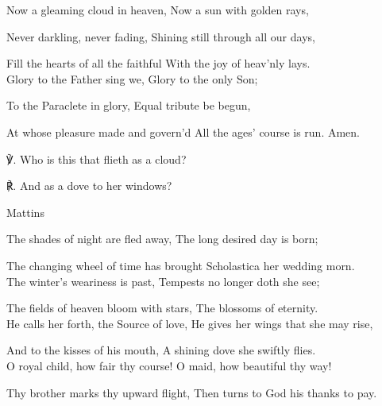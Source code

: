 \begin{paracol}{2}[]
\begin{hangparas}{1.25em}{1}
Now a gleaming cloud in heaven, Now a sun with golden rays,

Never darkling, never fading, Shining still through all our days,

Fill the hearts of all the faithful With the joy of heav'nly lays.\\

Glory to the Father sing we, Glory to the only Son;

To the Paraclete in glory, Equal tribute be begun,

At whose pleasure made and govern'd All the ages' course is run. Amen.\\
\end{hangparas}

℣. Who is this that flieth as a cloud? 

℟. And as a dove to her windows?


\switchcolumn

\begin{inhead}
	Mattins
\end{inhead}

\begin{hangparas}{1.25em}{1}

The shades of night are fled away, The long desired day is born;

The changing wheel of time has brought Scholastica her wedding morn.\\

The winter's weariness is past, Tempests no longer doth she see;

The fields of heaven bloom with stars, The blossoms of eternity.\\

He calls her forth, the Source of love, He gives her wings that she may rise,

And to the kisses of his mouth, A shining dove she swiftly flies.\\

O royal child, how fair thy course! O maid, how beautiful thy way!

Thy brother marks thy upward flight, Then turns to God his thanks to pay.\\


\end{hangparas}
\end{paracol}
